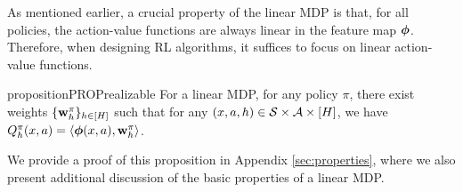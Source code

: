 As mentioned earlier, a crucial property of the linear MDP is that, for all policies, the action-value functions are always linear in the feature map $\bm{\phi}$. Therefore, when designing RL algorithms, it suffices to focus on linear action-value functions.









\begin{restatable}{proposition}{PROPrealizable} \label{prop:realizable}
For a linear MDP, for any policy $\pi$, there exist weights $\{\mathbf{w}^{\pi}_h\}_{h\in[H]}$ such that for any $(x, a, h) \in \mathcal{S}\times\mathcal{A}\times[H]$, we have $Q_h^\pi(x, a) = \langle\bm{\phi} (x, a),  \mathbf{w}^{\pi}_h\rangle$.
\end{restatable}

We provide a proof of this proposition in Appendix \ref{sec:properties}, where we also present additional  discussion of the basic properties of a linear MDP.